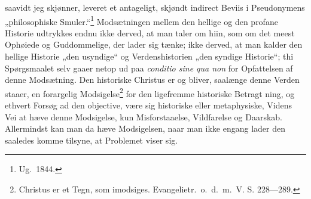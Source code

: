 saavidt jeg skjønner, leveret et antageligt, skjøndt indirect
Beviis i Pseudonymens „philosophiske Smuler.“\footnote{Ug.\ 1844.}
Modsætningen mellem den hellige og den profane Historie udtrykkes
endnu ikke derved, at man taler om hiin, som om det meest Ophøiede
og Guddommelige, der lader sig tænke; ikke derved, at man kalder
den hellige Historie „den usyndige“ og Verdenshistorien „den
syndige Historie“; thi Spørgsmaalet selv gaaer netop ud paa
\textit{conditio sine qua non} for Opfattelsen af denne
Modsætning. Den historiske Christus er og bliver, saalænge denne
Verden staaer, en forargelig Modsigelse\footnote{Christus er et
Tegn, som imodsiges. Evangelietr.\ o.\ d.\ m.\ V. S. 228---289.}
for den ligefremme historiske Betragt%
ning, og ethvert Forsøg ad den objective, være sig historiske
eller metaphysiske, Videns Vei at hæve denne Modsigelse, kun
Misforstaaelse, Vildfarelse og Daarskab. Allermindst kan man da
hæve Modsigelsen, naar man ikke engang lader den saaledes komme
tilsyne, at Problemet viser sig.

